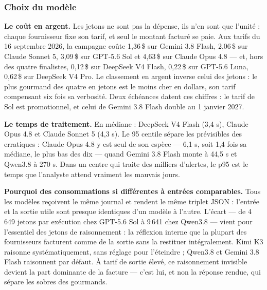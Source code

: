 \subsubsection{Choix du modèle}\label{sec:5-3-ancien}
\textbf{Le coût en argent.} Les jetons ne sont pas la dépense, ils n'en sont que l'unité : chaque fournisseur fixe son tarif, et seul le montant facturé se paie. Aux tarifs du 16 septembre 2026, la campagne coûte 1,36\,\$ sur Gemini 3.8 Flash, 2,06\,\$ sur Claude Sonnet 5, 3,09\,\$ sur GPT-5.6 Sol et 4,63\,\$ sur Claude Opus 4.8 --- et, hors des quatre finalistes, 0,12\,\$ sur DeepSeek V4 Flash, 0,22\,\$ sur GPT-5.6 Luna, 0,62\,\$ sur DeepSeek V4 Pro. Le classement en argent inverse celui des jetons : le plus gourmand des quatre en jetons est le moins cher en dollars, son tarif compensant six fois sa verbosité. Deux échéances datent ces chiffres : le tarif de Sol est promotionnel, et celui de Gemini 3.8 Flash double au 1 janvier 2027.

\textbf{Le temps de traitement.} En médiane : DeepSeek V4 Flash (3,4 s), Claude Opus 4.8 et Claude Sonnet 5 (4,3 s). Le 95 centile sépare les prévisibles des erratiques : Claude Opus 4.8 y est seul de son espèce --- 6,1 s, soit 1,4 fois sa médiane, le plus bas des dix --- quand Gemini 3.8 Flash monte à 44,5 s et Qwen3.8 à 270 s. Dans un centre qui traite des milliers d'alertes, le p95 est le temps que l'analyste attend vraiment les mauvais jours.

\textbf{Pourquoi des consommations si différentes à entrées comparables.} Tous les modèles reçoivent le même journal et rendent le même triplet JSON : l'entrée et la sortie utile sont presque identiques d'un modèle à l'autre. L'écart --- de 4\,649 jetons par exécution chez GPT-5.6 Sol à 9\,641 chez Qwen3.8 --- vient pour l'essentiel des jetons de raisonnement : la réflexion interne que la plupart des fournisseurs facturent comme de la sortie sans la restituer intégralement. Kimi K3 raisonne systématiquement, sans réglage pour l'éteindre ; Qwen3.8 et Gemini 3.8 Flash raisonnent par défaut. À tarif de sortie élevé, ce raisonnement invisible devient la part dominante de la facture --- c'est lui, et non la réponse rendue, qui sépare les sobres des gourmands.

